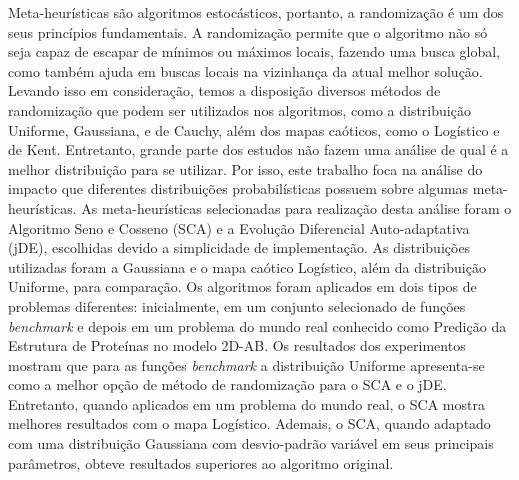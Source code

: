 Meta-heurísticas são algoritmos estocásticos, portanto, a randomização é um dos seus princípios fundamentais. A randomização permite que o algoritmo não só seja capaz de escapar de mínimos ou máximos locais, fazendo uma busca global, como também ajuda em buscas locais na vizinhança da atual melhor solução. Levando isso em consideração, temos a disposição diversos métodos de randomização que podem ser utilizados nos algoritmos, como a distribuição Uniforme, Gaussiana, e de Cauchy, além dos mapas caóticos, como o Logístico e de Kent. Entretanto, grande parte dos estudos não fazem uma análise de qual é a melhor distribuição para se utilizar. Por isso, este trabalho foca na análise do impacto que diferentes distribuições probabilísticas possuem sobre algumas meta-heurísticas. As meta-heurísticas selecionadas para realização desta análise foram o Algoritmo Seno e Cosseno (SCA) e a Evolução Diferencial Auto-adaptativa (jDE), escolhidas devido a simplicidade de implementação. As distribuições utilizadas foram a Gaussiana e o mapa caótico Logístico, além da distribuição Uniforme, para comparação. Os algoritmos foram aplicados em dois tipos de problemas diferentes: inicialmente, em um conjunto selecionado de funções \textit{benchmark} e depois em um problema do mundo real conhecido como Predição da Estrutura de Proteínas no modelo 2D-AB. Os resultados dos experimentos mostram que para as funções \textit{benchmark} a distribuição Uniforme apresenta-se como a melhor opção de método de randomização para o SCA e o jDE. Entretanto, quando aplicados em um problema do mundo real, o SCA mostra melhores resultados com o mapa Logístico. Ademais, o SCA, quando adaptado com uma distribuição Gaussiana com desvio-padrão variável em seus principais parâmetros, obteve resultados superiores ao algoritmo original.